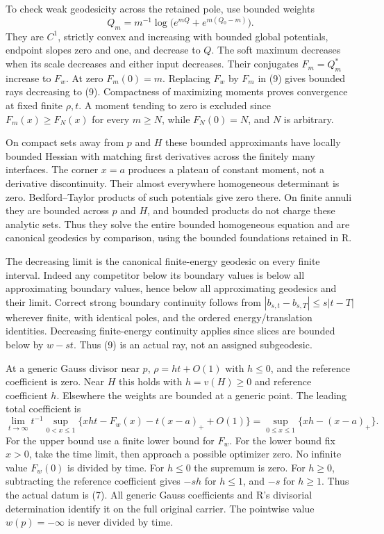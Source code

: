 \documentclass[
  11pt,
]{article}
\begin{document}
To check weak geodesicity across the retained pole, use bounded weights
\[
Q_m=m^{-1}\log\bigl(e^{mQ}+e^{m(Q_0-m)}\bigr).
\] They are \(C^1\), strictly convex and increasing with bounded global
potentials, endpoint slopes zero and one, and decrease to \(Q\). The
soft maximum decreases when its scale decreases and either input
decreases. Their conjugates \(F_m=Q_m^*\) increase to \(F_w\). At zero
\(F_m(0)=m\). Replacing \(F_w\) by \(F_m\) in (9) gives bounded rays
decreasing to (9). Compactness of maximizing moments proves convergence
at fixed finite \(\rho,t\). A moment tending to zero is excluded since
\(F_m(x)\ge F_N(x)\) for every \(m\ge N\), while \(F_N(0)=N\), and \(N\)
is arbitrary.

On compact sets away from \(p\) and \(H\) these bounded approximants
have locally bounded Hessian with matching first derivatives across the
finitely many interfaces. The corner \(x=a\) produces a plateau of
constant moment, not a derivative discontinuity. Their almost everywhere
homogeneous determinant is zero. Bedford--Taylor products of such
potentials give zero there. On finite annuli they are bounded across
\(p\) and \(H\), and bounded products do not charge these analytic sets.
Thus they solve the entire bounded homogeneous equation and are
canonical geodesics by comparison, using the bounded foundations
retained in R.

The decreasing limit is the canonical finite-energy geodesic on every
finite interval. Indeed any competitor below its boundary values is
below all approximating boundary values, hence below all approximating
geodesics and their limit. Correct strong boundary continuity follows
from \(|b_{s,t}-b_{s,T}|\le s|t-T|\) wherever finite, with identical
poles, and the ordered energy/translation identities. Decreasing
finite-energy continuity applies since slices are bounded below by
\(w-st\). Thus (9) is an actual ray, not an assigned subgeodesic.

At a generic Gauss divisor near \(p\), \(\rho=ht+O(1)\) with \(h\le0\),
and the reference coefficient is zero. Near \(H\) this holds with
\(h=v(H)\ge0\) and reference coefficient \(h\). Elsewhere the weights
are bounded at a generic point. The leading total coefficient is \[
\lim_{t\to\infty}t^{-1}\sup_{0<x\le1}
\{xht-F_w(x)-t(x-a)_++O(1)\}
=\sup_{0\le x\le1}\{xh-(x-a)_+\}.
\tag{14}
\] For the upper bound use a finite lower bound for \(F_w\). For the
lower bound fix \(x>0\), take the time limit, then approach a possible
optimizer zero. No infinite value \(F_w(0)\) is divided by time. For
\(h\le0\) the supremum is zero. For \(h\ge0\), subtracting the reference
coefficient gives \(-sh\) for \(h\le1\), and \(-s\) for \(h\ge1\). Thus
the actual datum is (7). All generic Gauss coefficients and R's
divisorial determination identify it on the full original carrier. The
pointwise value \(w(p)=-\infty\) is never divided by time.
\end{document}
